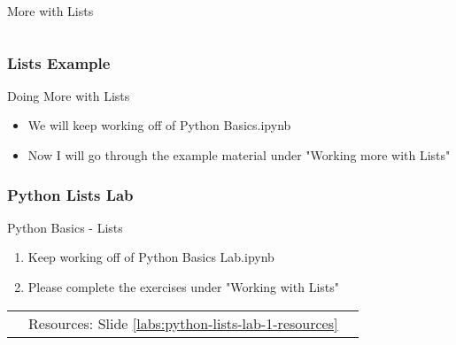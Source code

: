 \documentclass[handout, 11pt]{beamer}
\begin{document}
\begin{section}[Lists]{More with Lists}
\begin{frame}[fragile]
\begin{verbatim}
\end{verbatim}
\end{frame}
\begin{frame}
\frametitle{Lists Example}
{
\begin{block}{Doing More with Lists}
\begin{itemize}
\item We will keep working off of Python Basics.ipynb
\item Now I will go through the example material under "Working more with Lists"
\end{itemize}
\end{block}
}
\end{frame}
\begin{frame}
\frametitle{Python Lists Lab}
{
\begin{block}{Python Basics - Lists}
\begin{enumerate}
\item Keep working off of Python Basics Lab.ipynb
\item Please complete the exercises under "Working with Lists"
\end{enumerate}
\vfill
\begin{tabular*}{\textwidth}{@{\extracolsep{\fill}}ccc}
\toprule
\hfill & Resources: Slide \textcolor{blue}{\underline{\ref{labs:python-lists-lab-1-resources}}} & \hfill\\

\end{tabular*}
\end{block}
}
\label{labs:python-lists-lab-1}
\end{frame}
\end{section}
\end{document}
